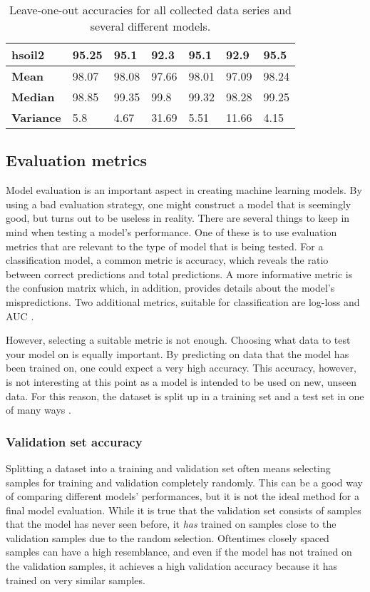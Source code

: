 \begin{table}
\begin{center}
\begin{adjustbox}{totalheight=\baselineskip}
\begin{tabular}{|l|l|l|l|l|l|l|}
		hsoil2 & 95.25 & 95.1 & \cellcolor{red!20}92.3 & 95.1 & \cellcolor{red!20}92.9 & 95.5\\
		\hline
		\textbf{Mean} & 98.07 & 98.08 & 97.66 & 98.01 & 97.09 & \cellcolor{green!20}98.24\\
		\textbf{Median} & 98.85 & 99.35 & \cellcolor{green!20}99.8 & 99.32 & 98.28 & 99.25\\
		\textbf{Variance} & 5.8 & 4.67 & 31.69 & 5.51 & 11.66 & \cellcolor{green!20}4.15\\
		\hline
		\end{tabular}
\end{adjustbox}
	\end{center}
	\label{tab:loo}
	\caption{Leave-one-out accuracies for all collected data series and several different models.}
\end{table}

\subsection{Evaluation metrics}
Model evaluation is an important aspect in creating machine learning models. By using a bad evaluation strategy, one might construct a model that is seemingly good, but turns out to be useless in reality. There are several things to keep in mind when testing a model's performance. One of these is to use evaluation metrics that are relevant to the type of model that is being tested. For a classification model, a common metric is accuracy, which reveals the ratio between correct predictions and total predictions. A more informative metric is the confusion matrix which, in addition, provides details about the model's mispredictions. Two additional metrics, suitable for classification are log-loss and AUC \citep{zheng_2015}. 

However, selecting a suitable metric is not enough. Choosing what data to test your model on is equally important. By predicting on data that the model has been trained on, one could expect a very high accuracy. This accuracy, however, is not interesting at this point as a model is intended to be used on new, unseen data. For this reason, the dataset is split up in a training set and a test set in one of many ways \citep{raschka}.


\subsubsection{Validation set accuracy}
Splitting a dataset into a training and validation set often means selecting samples for training and validation completely randomly. This can be a good way of comparing different models' performances, but it is not the ideal method for a final model evaluation. While it is true that the validation set consists of samples that the model has never seen before, it \textit{has} trained on samples close to the validation samples due to the random selection. Oftentimes closely spaced samples can have a high resemblance, and even if the model has not trained on the validation samples, it achieves a high validation accuracy because it has trained on very similar samples.


